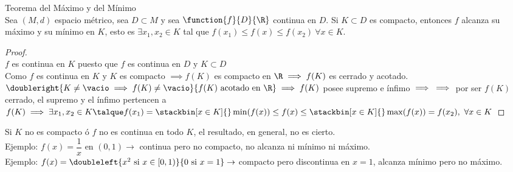 	\begin{teor} Teorema del Máximo y del Mínimo\\
	Sea $(M,d)$ espacio métrico, sea $D\subset M$ y sea $\function{f}{D}{\R}$ continua en $D$. Si $K\subset D$ es compacto, entonces $f$ alcanza su máximo y su mínimo en $K$, esto es $\exists x_1,x_2\in K$ tal que $f(x_1)\leq f(x)\leq f(x_2)\ \forall x\in K$.
	\begin{proof}\ \\
	$f$ es continua en $K$ puesto que $f$ es continua en $D$ y $K\subset D$\\
	Como $f$ es continua en $K$ y $K$ es compacto $\implies f(K)$ es compacto en $\R\implies f(K)$ es cerrado y acotado.
	$\doubleright{K\neq\vacio\implies f(K)\neq\vacio}{f(K)\mathrm{\ acotado\ en\ }\R}\implies f(K)$ posee supremo e ínfimo $\implies\\ \implies$ por ser $f(K)$ cerrado, el supremo y el ínfimo pertencen a $f(K)\implies\exists x_1,x_2\in K\talque f(x_1)=\stackbin[x\in K]{}\min(f(x))\leq f(x)\leq \stackbin[x\in K]{}\max(f(x))=f(x_2),\ \forall x\in K$
	\end{proof}
	\begin{observacion} Si $K$ no es compacto ó $f$ no es continua en todo $K$, el resultado, en general, no es cierto.\\
	Ejemplo: $f(x)=\dfrac{1}{x}$ en $(0,1)\rightarrow$ continua pero no compacto, no alcanza ni mínimo ni máximo.\\
	Ejemplo: $f(x)=\doubleleft{x^2\mathrm{\ si\ }x\in[0,1)}{0\mathrm{\ si\ }x=1}\rightarrow$ compacto pero discontinua en $x=1$, alcanza mínimo pero no máximo.
	\end{observacion}
	\end{teor}
	
